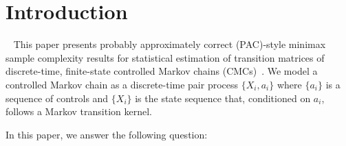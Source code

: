 \documentclass[opre,sglanonrev]{informs4}
\newcommand{\harsha}[1]{\textcolor{red}{[Harsha: #1]}}
\numberwithin{equation}{section}
\begin{document}
{
\section{Introduction}~\label{sec:intro}
This paper presents probably approximately correct (PAC)-style minimax sample complexity results for statistical estimation of transition matrices of discrete-time, finite-state controlled Markov chains (CMCs)~\citep{borkar1991topics}. 
% 
% 
% 
We model a controlled Markov chain as a discrete-time pair process $\{X_i,a_i\}$ where  $\{a_i\}$ is a sequence of controls and $\{X_i\}$ is the state sequence that, conditioned on $a_i$, follows a Markov transition kernel.
{ In this paper, we answer the following question:

}}
\end{document}
